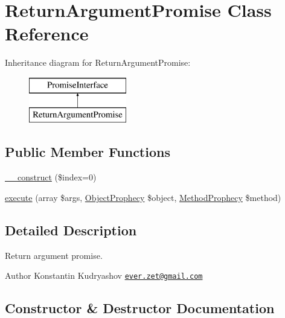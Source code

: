 \hypertarget{class_prophecy_1_1_promise_1_1_return_argument_promise}{}\section{Return\+Argument\+Promise Class Reference}
\label{class_prophecy_1_1_promise_1_1_return_argument_promise}
Inheritance diagram for Return\+Argument\+Promise\+:\begin{figure}[H]
\begin{center}
\leavevmode
\includegraphics[height=2.000000cm]{class_prophecy_1_1_promise_1_1_return_argument_promise}
\end{center}
\end{figure}
\subsection*{Public Member Functions}
\begin{DoxyCompactItemize}
\item 
\mbox{\hyperlink{class_prophecy_1_1_promise_1_1_return_argument_promise_aef2967434a5cec30d70f1f6c3419b827}{\+\_\+\+\_\+construct}} (\$index=0)
\item 
\mbox{\hyperlink{class_prophecy_1_1_promise_1_1_return_argument_promise_a2b8542872672f9ac4ed0c942f931f0c6}{execute}} (array \$args, \mbox{\hyperlink{class_prophecy_1_1_prophecy_1_1_object_prophecy}{Object\+Prophecy}} \$object, \mbox{\hyperlink{class_prophecy_1_1_prophecy_1_1_method_prophecy}{Method\+Prophecy}} \$method)
\end{DoxyCompactItemize}


\subsection{Detailed Description}
Return argument promise.

\begin{DoxyAuthor}{Author}
Konstantin Kudryashov \href{mailto:ever.zet@gmail.com}{\tt ever.\+zet@gmail.\+com} 
\end{DoxyAuthor}


\subsection{Constructor \& Destructor Documentation}
\mbox{\label{class_prophecy_1_1_promise_1_1_return_argument_promise_aef2967434a5cec30d70f1f6c3419b827}} 
